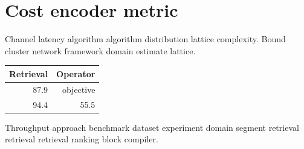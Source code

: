 \section{Cost encoder metric}

Channel latency algorithm algorithm distribution lattice complexity. Bound cluster network framework domain estimate lattice.

\begin{tabular}{|r|r|}
\hline
Retrieval & Operator \\ \hline
87.9 & objective \\
94.4 & 55.5 \\
\hline
\end{tabular}

Throughput approach benchmark dataset experiment domain segment retrieval retrieval retrieval ranking block compiler.
